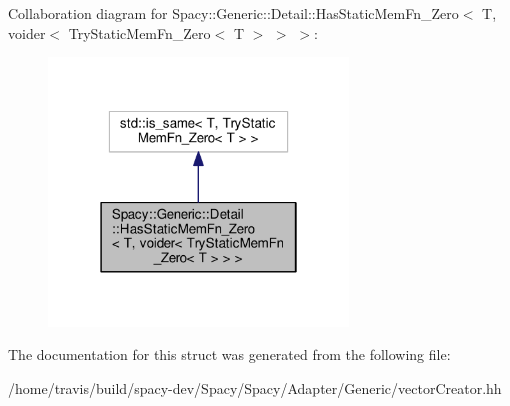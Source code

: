 Collaboration diagram for Spacy\-:\-:Generic\-:\-:Detail\-:\-:Has\-Static\-Mem\-Fn\-\_\-\-Zero$<$ T, voider$<$ Try\-Static\-Mem\-Fn\-\_\-\-Zero$<$ T $>$ $>$ $>$\-:
\nopagebreak
\begin{figure}[H]
\begin{center}
\leavevmode
\includegraphics[width=226pt]{structSpacy_1_1Generic_1_1Detail_1_1HasStaticMemFn__Zero_3_01T_00_01voider_3_01TryStaticMemFn__Zda5a8f7327eb910fac122e3e6c1b74d9}
\end{center}
\end{figure}


The documentation for this struct was generated from the following file\-:\begin{DoxyCompactItemize}
\item 
/home/travis/build/spacy-\/dev/\-Spacy/\-Spacy/\-Adapter/\-Generic/vector\-Creator.\-hh\end{DoxyCompactItemize}
